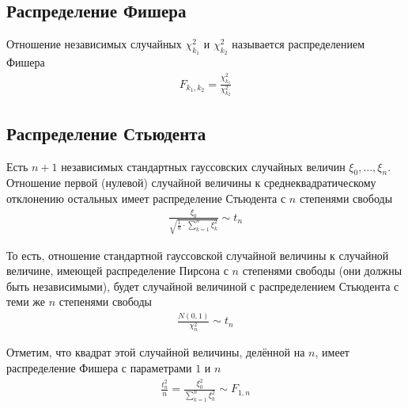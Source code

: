 \subsection{Распределение Фишера}
\begin{definition}
    Отношение независимых случайных $\chi_{k_1}^2$ и $\chi_{k_2}^2$ называется
    распределением Фишера
    \begin{align*}
        F_{k_1, k_2} = \frac{\chi_{k_1}^2}{\chi_{k_2}^2}
    \end{align*}
\end{definition}

\subsection{Распределение Стьюдента}
\begin{definition}
    Есть $n+1$ независимых стандартных гауссовских случайных величин
    $\xi_0, \dots, \xi_n$. Отношение первой (нулевой) случайной величины к
    среднеквадратическому отклонению остальных имеет распределение Стьюдента
    с $n$ степенями свободы
    \begin{align*}
        \frac{\xi_0}{\sqrt{\frac{1}{n} \cdot \sum_{k=1}^{n}\xi_k^2}} \sim t_n
    \end{align*}
\end{definition}

То есть, отношение стандартной гауссовской случайной величины к случайной
величине, имеющей распределение Пирсона с $n$ степенями свободы (они должны быть
независимыми), будет случайной величиной с распределением Стьюдента с теми же
$n$ степенями свободы
\begin{align*}
    \frac{N\left( 0, 1 \right)}{\chi_n^2} \sim t_n
\end{align*}

Отметим, что квадрат этой случайной величины, делённой на $n$, имеет
распределение Фишера с параметрами $1$ и $n$
\begin{align*}
    \frac{t_n^2}{n}
    = \frac{\xi_0^2}{\sum_{k=1}^{n}\xi_k^2}
    \sim F_{1, n}
\end{align*}

